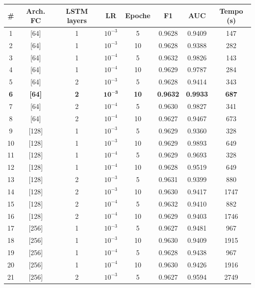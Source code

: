 \documentclass[../main.tex]{subfiles}
\begin{document}
\begin{table}[H]
\centering
\small
\setlength{\tabcolsep}{5pt}
\begin{tabular}{cccccccc}
\toprule
\textbf{\#} &
\textbf{Arch. FC} &
\textbf{LSTM layers} &
\textbf{LR} &
\textbf{Epoche} &
\textbf{F1} &
\textbf{AUC} &
\textbf{Tempo (s)} \\
\midrule
1  & [64]      & 1 & $10^{-3}$ &  5 & 0.9628 & 0.9409 &   147 \\
2  & [64]      & 1 & $10^{-3}$ & 10 & 0.9628 & 0.9388 &   282 \\
3  & [64]      & 1 & $10^{-4}$ &  5 & 0.9632 & 0.9826 &   143 \\
4  & [64]      & 1 & $10^{-4}$ & 10 & 0.9629 & 0.9787 &   284 \\
5  & [64]      & 2 & $10^{-3}$ &  5 & 0.9628 & 0.9414 &   343 \\
\textbf{6}  & \textbf{[64]} & \textbf{2} & $\mathbf{10^{-3}}$ & \textbf{10} & \textbf{0.9632} & \textbf{0.9933} & \textbf{687} \\
7  & [64]      & 2 & $10^{-4}$ &  5 & 0.9630 & 0.9827 &   341 \\
8  & [64]      & 2 & $10^{-4}$ & 10 & 0.9627 & 0.9467 &   673 \\
\midrule
9  & [128]     & 1 & $10^{-3}$ &  5 & 0.9629 & 0.9360 &   328 \\
10 & [128]     & 1 & $10^{-3}$ & 10 & 0.9629 & 0.9893 &   649 \\
11 & [128]     & 1 & $10^{-4}$ &  5 & 0.9629 & 0.9693 &   328 \\
12 & [128]     & 1 & $10^{-4}$ & 10 & 0.9628 & 0.9519 &   649 \\
13 & [128]     & 2 & $10^{-3}$ &  5 & 0.9631 & 0.9399 &   880 \\
14 & [128]     & 2 & $10^{-3}$ & 10 & 0.9630 & 0.9417 &  1747 \\
15 & [128]     & 2 & $10^{-4}$ &  5 & 0.9632 & 0.9410 &   882 \\
16 & [128]     & 2 & $10^{-4}$ & 10 & 0.9629 & 0.9403 &  1746 \\
\midrule
17 & [256]     & 1 & $10^{-3}$ &  5 & 0.9627 & 0.9481 &   967 \\
18 & [256]     & 1 & $10^{-3}$ & 10 & 0.9630 & 0.9409 &  1915 \\
19 & [256]     & 1 & $10^{-4}$ &  5 & 0.9628 & 0.9438 &   967 \\
20 & [256]     & 1 & $10^{-4}$ & 10 & 0.9630 & 0.9426 &  1916 \\
21 & [256]     & 2 & $10^{-3}$ &  5 & 0.9627 & 0.9594 &  2749 \\

\end{tabular}
\end{table}
\end{document}
